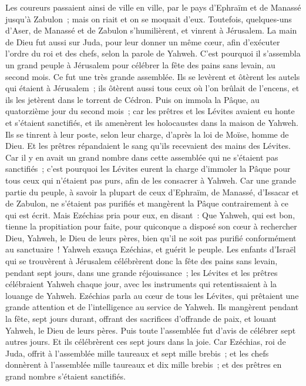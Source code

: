 \begin{multicols}{2}
Les coureurs passaient ainsi de ville en ville, par le pays d'Ephraïm et de Manassé jusqu'à Zabulon~; mais on riait et on se moquait d'eux.
Toutefois, quelques-uns d'Aser, de Manassé et de Zabulon s'humilièrent, et vinrent à Jérusalem.
La main de Dieu fut aussi sur Juda, pour leur donner un même cœur, afin d'exécuter l'ordre du roi et des chefs, selon la parole de Yahweh.
C'est pourquoi il s'assembla un grand peuple à Jérusalem pour célébrer la fête des pains sans levain, au second mois. Ce fut une très grande assemblée.
Ils se levèrent et ôtèrent les autels qui étaient à Jérusalem~; ils ôtèrent aussi tous ceux où l'on brûlait de l'encens, et ils les jetèrent dans le torrent de Cédron.
Puis on immola la Pâque, au quatorzième jour du second mois~; car les prêtres et les Lévites avaient eu honte et s'étaient sanctifiés, et ils amenèrent les holocaustes dans la maison de Yahweh.
Ils se tinrent à leur poste, selon leur charge, d'après la loi de Moïse, homme de Dieu. Et les prêtres répandaient le sang qu'ils recevaient des mains des Lévites.
Car il y en avait un grand nombre dans cette assemblée qui ne s'étaient pas sanctifiés~; c'est pourquoi les Lévites eurent la charge d'immoler la Pâque pour tous ceux qui n'étaient pas purs, afin de les consacrer à Yahweh.
Car une grande partie du peuple, à savoir la plupart de ceux d'Ephraïm, de Manassé, d'Issacar et de Zabulon, ne s'étaient pas purifiés et mangèrent la Pâque contrairement à ce qui est écrit. Mais Ezéchias pria pour eux, en disant~: Que Yahweh, qui est bon, tienne la propitiation pour faite,
pour quiconque a disposé son cœur à rechercher Dieu, Yahweh, le Dieu de leurs pères, bien qu'il ne soit pas purifié conformément au sanctuaire~!
Yahweh exauça Ezéchias, et guérit le peuple.
Les enfants d'Israël qui se trouvèrent à Jérusalem célébrèrent donc la fête des pains sans levain, pendant sept jours, dans une grande réjouissance~; les Lévites et les prêtres célébraient Yahweh chaque jour, avec les instruments qui retentissaient à la louange de Yahweh.
Ezéchias parla au cœur de tous les Lévites, qui prêtaient une grande attention et de l'intelligence au service de Yahweh. Ils mangèrent pendant la fête, sept jours durant, offrant des sacrifices d'offrande de paix, et louant Yahweh, le Dieu de leurs pères.
Puis toute l'assemblée fut d'avis de célébrer sept autres jours. Et ils célébrèrent ces sept jours dans la joie.
Car Ezéchias, roi de Juda, offrit à l'assemblée mille taureaux et sept mille brebis~; et les chefs donnèrent à l'assemblée mille taureaux et dix mille brebis~; et des prêtres en grand nombre s'étaient sanctifiés.

\end{multicols}
